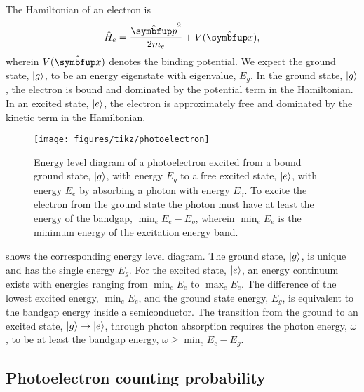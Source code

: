 The Hamiltonian of an electron is
\begin{equation}
	\hat{H}_e
	=
	\frac{\vu{p}^2}{2m_e}
	+
	V(\vu{x})
	,
\end{equation}
wherein $V(\vu{x})$ denotes the binding potential.
We expect the ground state, $\lvert g\rangle$, to be an energy eigenstate with eigenvalue, $E_g$.
In the ground state, $\lvert g\rangle$, the electron is bound and dominated by the potential term in the Hamiltonian.
In an excited state, $\lvert e\rangle$, the electron is approximately free and dominated by the kinetic term in the Hamiltonian.
\begin{figure}[htb]
    \centering
    \texttt{[image: figures/tikz/photoelectron]}
    \caption{Energy level diagram of a photoelectron excited from a bound ground state, $\lvert g\rangle$, with energy $E_g$ to a free excited state, $\lvert e\rangle$, with energy $E_e$ by absorbing a photon with energy $E_\gamma$. To excite the electron from the ground state the photon must have at least the energy of the bandgap, $\min_eE_e-E_g$, wherein $\min_eE_e$ is the minimum energy of the excitation energy band.}\label{fig:photoelectron}
\end{figure}
 shows the corresponding energy level diagram.
The ground state, $\lvert g\rangle$, is unique and has the single energy $E_g$.
For the excited state, $\lvert e\rangle$, an energy continuum exists with energies ranging from $\min_eE_e$ to $\max_eE_e$.
The difference of the lowest excited energy, $\min_eE_e$, and the ground state energy, $E_g$, is equivalent to the bandgap energy inside a semiconductor.
The transition from the ground to an excited state, $\lvert g\rangle\to\lvert e\rangle$, through photon absorption requires the photon energy, $\omega$, to be at least the bandgap energy, $\omega\geq\min_eE_e-E_g$.

\subsection{Photoelectron counting probability}


